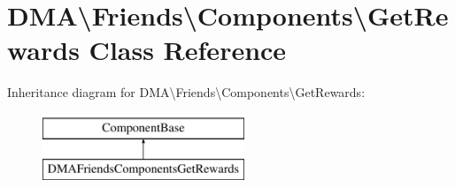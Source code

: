 \hypertarget{classDMA_1_1Friends_1_1Components_1_1GetRewards}{\section{D\+M\+A\textbackslash{}Friends\textbackslash{}Components\textbackslash{}Get\+Rewards Class Reference}
\label{classDMA_1_1Friends_1_1Components_1_1GetRewards}
}
Inheritance diagram for D\+M\+A\textbackslash{}Friends\textbackslash{}Components\textbackslash{}Get\+Rewards\+:\begin{figure}[H]
\begin{center}
\leavevmode
\includegraphics[height=2.000000cm]{d7/de7/classDMA_1_1Friends_1_1Components_1_1GetRewards}
\end{center}
\end{figure}
